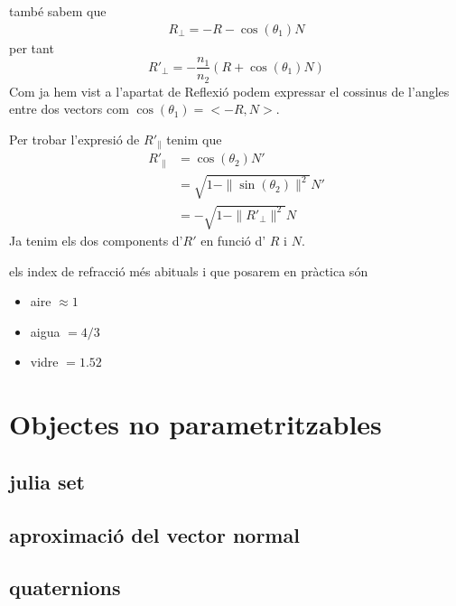\documentclass{article}
\begin{document}
també sabem que 
\begin{align*}
   R_{ \bot} = -R-\cos(\theta_1)N
\end{align*}
per tant 
\begin{equation*}
   R'_{ \bot} = -\frac{n_1}{n_2} (R+\cos(\theta_1)N)
\end{equation*}
Com ja hem vist a l'apartat de Reflexió podem expressar el cossinus de l'angles entre dos vectors com $\cos(\theta_1)= <-R, N>$.

Per trobar l'expresió de $R'_{\parallel}$ tenim que 
\begin{align*}
   R'_{\parallel} &= \cos(\theta_2)N'\\
                  &= \sqrt{1-\|\sin(\theta_2)\|^2} N' \\ 
                  &= -\sqrt{1-\|R'_{\bot}\|^2}N
\end{align*}
Ja tenim els dos components d'$R'$ en funció d' $R$ i  $N$.


els index de refracció més abituals i que posarem en pràctica són
\begin{itemize}
   \item aire $ \approx 1$
   \item aigua $=4 / 3$
   \item vidre  $=1.52$
\end{itemize}



\section{Objectes no parametritzables}
\subsection{julia set}
\subsection{aproximació del vector normal}
\subsection{quaternions}
\end{document}
